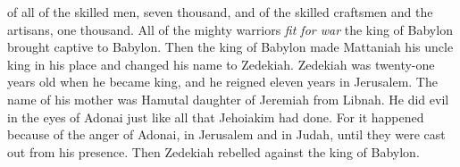 \begin{biblechapter}
\verse of all of the skilled men, seven thousand, and of the skilled craftsmen and the artisans, one thousand. All of the mighty warriors \textit{fit for war} the king of Babylon brought captive to Babylon.
\verse Then the king of Babylon made Mattaniah his uncle king in his place and changed his name to Zedekiah.
 Zedekiah was twenty-one years old when he became king, and he reigned eleven years in Jerusalem. The name of his mother was Hamutal daughter of Jeremiah from Libnah.
\verse He did evil in the eyes of Adonai just like all that Jehoiakim had done.
\verse For it happened because of the anger of Adonai, in Jerusalem and in Judah, until they were cast out from his presence. Then Zedekiah rebelled against the king of Babylon.
\end{biblechapter}

